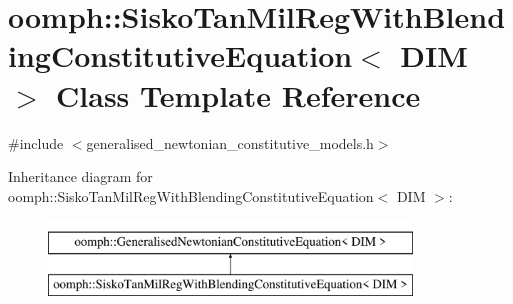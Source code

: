 \hypertarget{classoomph_1_1SiskoTanMilRegWithBlendingConstitutiveEquation}{}\section{oomph\+:\+:Sisko\+Tan\+Mil\+Reg\+With\+Blending\+Constitutive\+Equation$<$ D\+IM $>$ Class Template Reference}
\label{classoomph_1_1SiskoTanMilRegWithBlendingConstitutiveEquation}


{\ttfamily \#include $<$generalised\+\_\+newtonian\+\_\+constitutive\+\_\+models.\+h$>$}

Inheritance diagram for oomph\+:\+:Sisko\+Tan\+Mil\+Reg\+With\+Blending\+Constitutive\+Equation$<$ D\+IM $>$\+:\begin{figure}[H]
\begin{center}
\leavevmode
\includegraphics[height=2.000000cm]{classoomph_1_1SiskoTanMilRegWithBlendingConstitutiveEquation}
\end{center}
\end{figure}
